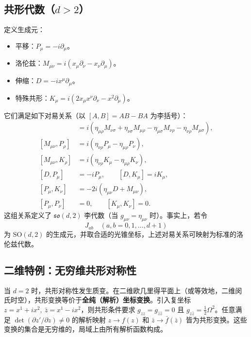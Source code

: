 \subsection*{共形代数（$d>2$）}

定义生成元：
\begin{itemize}
    \item 平移：$P_\mu = -i\partial_\mu$。
    \item 洛伦兹：$M_{\mu\nu} = i(x_\mu\partial_\nu - x_\nu\partial_\mu)$。
    \item 伸缩：$D = -i x^\mu \partial_\mu$。
    \item 特殊共形：$K_\mu = i(2x_\mu x^\nu\partial_\nu - x^2\partial_\mu)$。
\end{itemize}
它们满足如下对易关系（以 $[A,B]=AB-BA$ 为李括号）：
\begin{align}
[M_{\mu\nu}, M_{\rho\sigma}] &= i(\eta_{\mu\rho}M_{\nu\sigma} + \eta_{\nu\sigma}M_{\mu\rho} - \eta_{\mu\sigma}M_{\nu\rho} - \eta_{\nu\rho}M_{\mu\sigma}), \\
[M_{\mu\nu}, P_\rho] &= i(\eta_{\nu\rho} P_\mu - \eta_{\mu\rho} P_\nu), \\
[M_{\mu\nu}, K_\rho] &= i(\eta_{\nu\rho} K_\mu - \eta_{\mu\rho} K_\nu), \\
[D, P_\mu] &= -i P_\mu, \qquad [D, K_\mu] = i K_\mu, \\
[P_\mu, K_\nu] &= -2i(\eta_{\mu\nu} D + M_{\mu\nu}), \\
[P_\mu, P_\nu] &= 0, \qquad [K_\mu, K_\nu] = 0.
\end{align}
这组关系定义了 $\mathfrak{so}(d,2)$ 李代数（当 $g_{\mu\nu}=\eta_{\mu\nu}$ 时）。事实上，若令
\begin{equation}
J_{ab} \quad (a,b=0,1,\dots,d+1)
\end{equation}
为 $\mathrm{SO}(d,2)$ 的生成元，并取合适的光锥坐标，上述对易关系可映射为标准的洛伦兹代数。

\subsection*{二维特例：无穷维共形对称性}

当 $d=2$ 时，共形对称性发生质变。在二维欧几里得平面上（或等效地，二维闵氏时空），共形变换等价于\textbf{全纯（解析）坐标变换}。引入复坐标 $z = x^1 + i x^2,\ \bar{z} = x^1 - i x^2$，则共形条件要求 $g_{zz} = g_{\bar{z}\bar{z}} = 0$ 且 $g_{z\bar{z}} = \frac12 \Omega^2$。任意满足 $\det(\partial z'/\partial z) \neq 0$ 的解析映射 $z\to f(z)$ 和 $\bar{z}\to \bar{f}(\bar{z})$ 皆为共形变换。这些变换的集合是无穷维的，局域上由所有解析函数构成。

